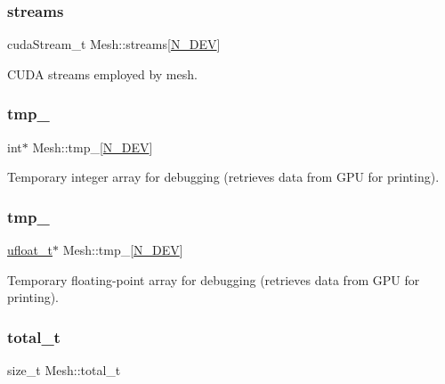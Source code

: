 \subsubsection{\texorpdfstring{streams}{streams}}
{\footnotesize\ttfamily cuda\+Stream\+\_\+t Mesh\+::streams\mbox{[}\hyperlink{cppspec_8h_a2b674dab7a14f1bf32b48b7fda5022dc}{N\+\_\+\+D\+EV}\mbox{]}}



C\+U\+DA streams employed by mesh. 

\mbox{\label{classMesh_a7bd12663f1a162d1992ccd63a80197ca}} 
\subsubsection{\texorpdfstring{tmp\+\_}{tmp\_1}}
{\footnotesize\ttfamily int$\ast$ Mesh\+::tmp\+\_\mbox{[}\hyperlink{cppspec_8h_a2b674dab7a14f1bf32b48b7fda5022dc}{N\+\_\+\+D\+EV}\mbox{]}\hspace{0.3cm}{\ttfamily [private]}}



Temporary integer array for debugging (retrieves data from G\+PU for printing). 

\mbox{\label{classMesh_ad58f3cf697a92987d99ee30269e1f873}} 
\subsubsection{\texorpdfstring{tmp\+\_}{tmp\_2}}
{\footnotesize\ttfamily \hyperlink{cppspec_8h_af529d360dfac9b9578aa719418a53a21}{ufloat\+\_\+t}$\ast$ Mesh\+::tmp\+\_\mbox{[}\hyperlink{cppspec_8h_a2b674dab7a14f1bf32b48b7fda5022dc}{N\+\_\+\+D\+EV}\mbox{]}\hspace{0.3cm}{\ttfamily [private]}}



Temporary floating-\/point array for debugging (retrieves data from G\+PU for printing). 

\mbox{\label{classMesh_ac23ac4c93953c3264ce7fd184f33d556}} 
\subsubsection{\texorpdfstring{total\+\_\+t}{total\_t}}
{\footnotesize\ttfamily size\+\_\+t Mesh\+::total\+\_\+t}



